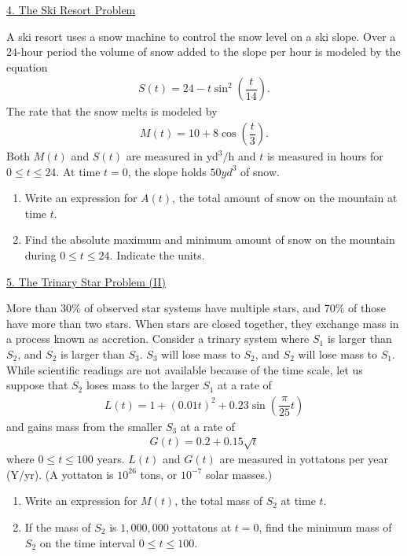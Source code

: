 \begin{center}
    \underline{4. The Ski Resort Problem}
\end{center}
A ski resort uses a snow machine to control the snow level on a ski slope. Over a $24$-hour period the volume of snow added to the slope per hour is modeled by the equation \begin{align*}
    S(t) = 24 - t\sin^2 \left(\dfrac{t}{14}\right).
\end{align*}
The rate that the snow melts is modeled by \begin{align*}
    M(t) = 10 + 8\cos \left(\dfrac{t}{3}\right).
\end{align*}
Both $M(t)$ and $S(t)$ are measured in $\text{yd}^3/\text{h}$ and $t$ is measured in hours for $0 \leq t \leq 24$. At time $t = 0$, the slope holds $50 \si{yd^3}$ of snow. \\
\begin{enumerate}[label=\hspace{11pt}(\alph*), align=left, leftmargin=*, labelsep=0.25em]
    \item Write an expression for $A(t)$, the total amount of snow on the mountain at time $t$.
    \item Find the absolute maximum and minimum amount of snow on the mountain during $0 \leq t \leq 24$. Indicate the units.
\end{enumerate} \vspace{11pt}

\begin{center}
    \underline{5. The Trinary Star Problem (II)}
\end{center}

More than 30\% of observed star systems have multiple stars, and 70\% of those have more than two stars. When stars are closed together, they exchange mass in a process known as accretion. Consider a trinary system where $S_1$ is larger than $S_2$, and $S_2$ is larger than $S_3$. $S_3$ will lose mass to $S_2$, and $S_2$ will lose mass to $S_1$. While scientific readings are not available because of the time scale, let us suppose that $S_2$ loses mass to the larger $S_1$ at a rate of \begin{align*}
    L(t) = 1 + (0.01t)^2 + 0.23\sin \left(\dfrac{\pi}{25}t\right)
\end{align*}
and gains mass from the smaller $S_3$ at a rate of \begin{align*}
    G(t) = 0.2 + 0.15\sqrt{t}
\end{align*}
where $0 \leq t \leq 100$ years. $L(t)$ and $G(t)$ are measured in yottatons per year (Y/yr). (A yottaton is $10^{26}$ tons, or $10^{-7}$ solar masses.) \\
\begin{enumerate}[label=\hspace{11pt}(\alph*), align=left, leftmargin=*, labelsep=0.25em]
    \item Write an expression for $M(t)$, the total mass of $S_2$ at time $t$.
    \item If the mass of $S_2$ is $1,000,000$ yottatons at $t = 0$, find the minimum mass of $S_2$ on the time interval $0 \leq t \leq 100$.
\end{enumerate} \vspace{11pt}

